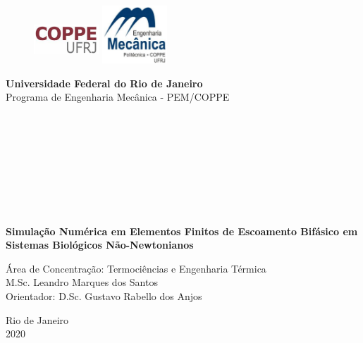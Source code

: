 \begin{titlepage}
\begin{center}


  \begin{figure}[hbt!]
		          \includegraphics[width=2.44cm,height=1.8cm]{figure/coppe.png}
		   \hfill \includegraphics[width=2.44cm,height=2.17cm]{figure/pem.png}
  \end{figure}



  \vspace{-2cm}
  \hspace{0cm}\large{\textbf{Universidade Federal do Rio de Janeiro}}\\
  \hspace{0cm}\large{Programa de Engenharia Mecânica - PEM/COPPE}\\

  \hspace{2cm}\large{}\\
  \hspace{2cm}\large{}\\
  \hspace{2cm}\large{}\\
  \hspace{2cm}\large{}\\

  \hspace{2cm}\large{}\\
  \hspace{2cm}\large{}\\
  \hspace{2cm}\large{}\\
  \hspace{2cm}\large{}\\


  \par
  \vspace{1cm}
  \textbf{\LARGE \justifying Simulação Numérica em Elementos Finitos de Escoamento Bifásico em Sistemas Biológicos Não-Newtonianos }

  \par
  \vspace{0.5cm}
  {Área de Concentração: Termociências e Engenharia Térmica}\\
  \vspace{0.5cm}
  {M.Sc. Leandro Marques dos Santos}\\
  \vspace{0.3cm}
  {Orientador: D.Sc. Gustavo Rabello dos Anjos}



  \par\vfill
  {\large Rio de Janeiro\\2020}

\end{center}
\end{titlepage}
